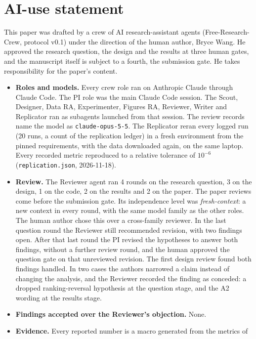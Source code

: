 \section*{AI-use statement}

This paper was drafted by a crew of AI research-assistant agents
(Free-Research-Crew, protocol v0.1) under the direction of the human author, Bryce Wang.
He approved the research question, the design and the results at three human gates, and
the manuscript itself is subject to a fourth, the submission gate. He takes responsibility
for the paper's content.

\begin{itemize}
  \item \textbf{Roles and models.} Every crew role ran on Anthropic Claude through Claude
        Code. The PI role was the main Claude Code session. The Scout, Designer, Data RA,
        Experimenter, Figures RA, Reviewer, Writer and Replicator ran as subagents launched
        from that session. The review records name the model as \texttt{claude-opus-5-5}.
        The Replicator reran every logged run (20 runs, a count of the replication ledger)
        in a fresh environment from the pinned requirements, with the data downloaded again,
        on the same laptop. Every recorded metric reproduced to a relative tolerance of
        $10^{-6}$ (\texttt{replication.json}, 2026-11-18).
  \item \textbf{Review.} The Reviewer agent ran 4 rounds on the research question, 3 on the
        design, 1 on the code, 2 on the results and 2 on the paper. The paper reviews come
        before the submission gate. Its independence level was \emph{fresh-context}: a new context in
        every round, with the same model family as the other roles. The human author chose
        this over a cross-family reviewer. In the last question round the Reviewer still
        recommended revision, with two findings open. After that last round the PI revised
        the hypotheses to answer both findings, without a further review round, and the
        human approved the question gate on that unreviewed revision. The first design
        review found both findings handled. In two cases the authors narrowed a claim instead
        of changing the analysis, and the Reviewer recorded the finding as conceded: a
        dropped ranking-reversal hypothesis at the question stage, and the A2 wording at
        the results stage.
  \item \textbf{Findings accepted over the Reviewer's objection.} None.
  \item \textbf{Evidence.} Every reported number is a macro generated from the metrics of

\end{itemize}

